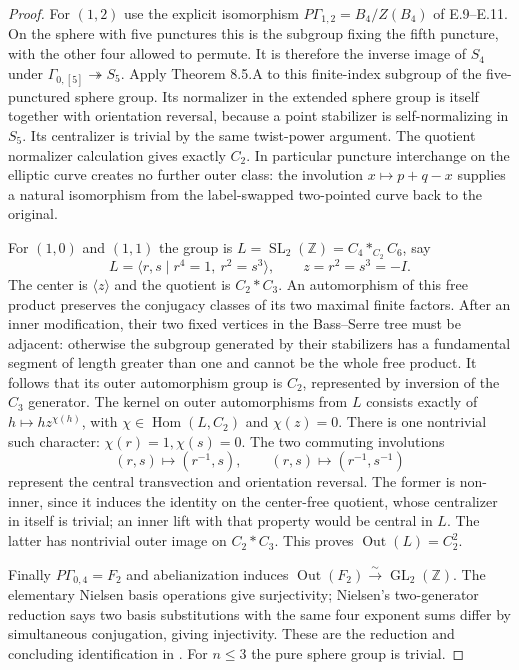 \begin{proof}
For $(1,2)$ use the explicit isomorphism
$P\Gamma_{1,2}=B_4/Z(B_4)$ of E.9--E.11.  On the sphere
with five punctures this is the subgroup fixing the fifth
puncture, with the other four allowed to permute.  It is
therefore the inverse image of $S_4$ under
$\Gamma_{0,[5]}\twoheadrightarrow S_5$.  Apply Theorem
8.5.A to this finite-index subgroup of the five-punctured
sphere group.  Its normalizer in the extended sphere group
is itself together with orientation reversal, because a
point stabilizer is self-normalizing in $S_5$.  Its
centralizer is trivial by the same twist-power argument.
The quotient normalizer calculation gives exactly $C_2$.
In particular puncture interchange on the elliptic curve
creates no further outer class: the involution
$x\mapsto p+q-x$ supplies a natural isomorphism from the
label-swapped two-pointed curve back to the original.

For $(1,0)$ and $(1,1)$ the group is
$L=\operatorname{SL}_2(\mathbb Z)=C_4*_{C_2}C_6$, say
\[
 L=\langle r,s\mid r^4=1,\ r^2=s^3\rangle,
 \qquad z=r^2=s^3=-I.
\]
The center is $\langle z\rangle$ and the quotient is
$C_2*C_3$.  An automorphism of this free product preserves
the conjugacy classes of its two maximal finite factors.
After an inner modification, their two fixed vertices in
the Bass--Serre tree must be adjacent: otherwise the
subgroup generated by their stabilizers has a fundamental
segment of length greater than one and cannot be the
whole free product.  It follows that its outer
 automorphism group is $C_2$, represented by inversion of
the $C_3$ generator.  The kernel on outer automorphisms
from $L$ consists exactly of
$h\mapsto h z^{\chi(h)}$, with
$\chi\in\operatorname{Hom}(L,C_2)$ and $\chi(z)=0$.
There is one nontrivial such character:
$\chi(r)=1,\chi(s)=0$.  The two commuting involutions
\[
 (r,s)\longmapsto(r^{-1},s),\qquad
 (r,s)\longmapsto(r^{-1},s^{-1})                              \tag{E.37}
\]
represent the central transvection and orientation reversal.
The former is non-inner, since it induces the identity on
the center-free quotient, whose centralizer in itself is
trivial; an inner lift with that property would be central
in $L$.  The latter has nontrivial outer image on $C_2*C_3$.
This proves $\operatorname{Out}(L)=C_2^2$.

Finally $P\Gamma_{0,4}=F_2$ and abelianization induces
$\operatorname{Out}(F_2)\xrightarrow{\sim}
\operatorname{GL}_2(\mathbb Z)$.  The elementary Nielsen
basis operations give surjectivity; Nielsen's two-generator
reduction says two basis substitutions with the same four
exponent sums differ by simultaneous conjugation, giving
injectivity.  These are the reduction and concluding
identification in \cite[\S\S III--IV, pp.~395--397]{ET_Nielsen1917}.
For $n\leq3$ the pure sphere group is trivial.


\end{proof}
